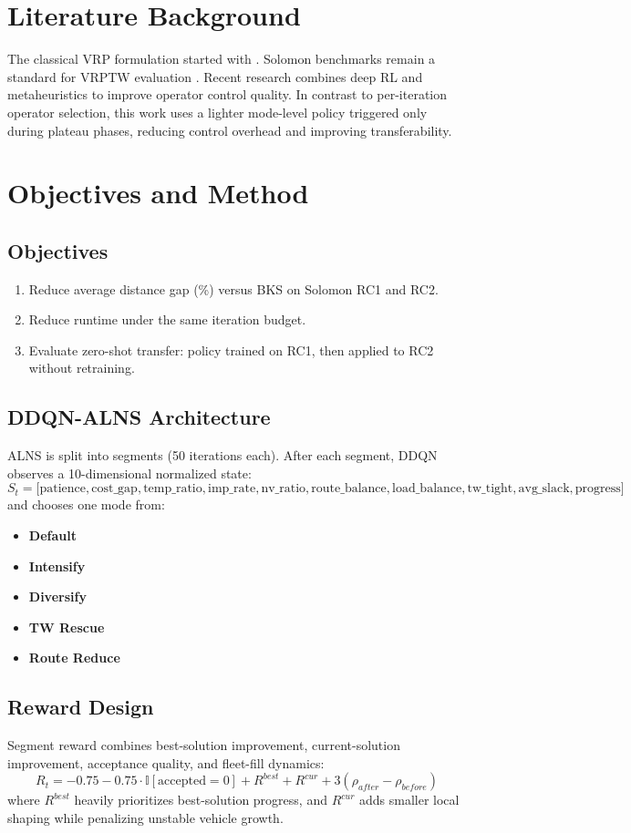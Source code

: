 \documentclass[13pt, a4paper]{extarticle}
\begin{document}
\section{Literature Background}
The classical VRP formulation started with \citep{Dantzig1959}. Solomon benchmarks remain a standard for VRPTW evaluation \citep{Solomon1987}. Recent research combines deep RL and metaheuristics to improve operator control quality. In contrast to per-iteration operator selection, this work uses a lighter mode-level policy triggered only during plateau phases, reducing control overhead and improving transferability.

\section{Objectives and Method}
\subsection{Objectives}
\begin{enumerate}
    \item Reduce average distance gap (\%) versus BKS on Solomon RC1 and RC2.
    \item Reduce runtime under the same iteration budget.
    \item Evaluate zero-shot transfer: policy trained on RC1, then applied to RC2 without retraining.
\end{enumerate}

\subsection{DDQN-ALNS Architecture}
ALNS is split into segments (50 iterations each). After each segment, DDQN observes a 10-dimensional normalized state:
\[
S_t = \big[\text{patience}, \text{cost\_gap}, \text{temp\_ratio}, \text{imp\_rate}, \text{nv\_ratio},
\text{route\_balance}, \text{load\_balance}, \text{tw\_tight}, \text{avg\_slack}, \text{progress}\big]
\]
and chooses one mode from:
\begin{itemize}
    \item \textbf{Default}
    \item \textbf{Intensify}
    \item \textbf{Diversify}
    \item \textbf{TW Rescue}
    \item \textbf{Route Reduce}
\end{itemize}

\subsection{Reward Design}
Segment reward combines best-solution improvement, current-solution improvement, acceptance quality, and fleet-fill dynamics:
\[
R_t = -0.75 - 0.75 \cdot \mathbb{I}[\text{accepted}=0] + R^{best} + R^{cur} + 3(\rho_{after}-\rho_{before})
\]
where $R^{best}$ heavily prioritizes best-solution progress, and $R^{cur}$ adds smaller local shaping while penalizing unstable vehicle growth.
\end{document}
